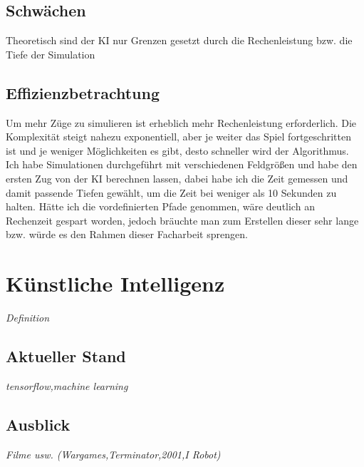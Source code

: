 \documentclass[12pt,a4paper,ngerman]{article}
\begin{document}
	\subsection{Schwächen}
	Theoretisch sind der KI nur Grenzen gesetzt durch die Rechenleistung bzw. die Tiefe der Simulation
	\subsection{Effizienzbetrachtung}
	Um mehr Züge zu simulieren ist erheblich mehr Rechenleistung erforderlich. Die Komplexität steigt nahezu exponentiell, aber je weiter das Spiel fortgeschritten ist und je weniger Möglichkeiten es gibt, desto schneller wird der Algorithmus. Ich habe Simulationen durchgeführt mit verschiedenen Feldgrößen und habe den ersten Zug von der KI berechnen lassen, dabei habe ich die Zeit gemessen und damit passende Tiefen gewählt, um die Zeit bei weniger als 10 Sekunden zu halten. Hätte ich die vordefinierten Pfade genommen, wäre deutlich an Rechenzeit gespart worden, jedoch bräuchte man zum Erstellen dieser sehr lange bzw. würde es den Rahmen dieser Facharbeit sprengen.
	\section{Künstliche Intelligenz}
	\textit{Definition}
	\subsection{Aktueller Stand}
	\textit{tensorflow,machine learning}
	\subsection{Ausblick}
	\textit{Filme usw. (Wargames,Terminator,2001,I Robot)}
	
\end{document}
